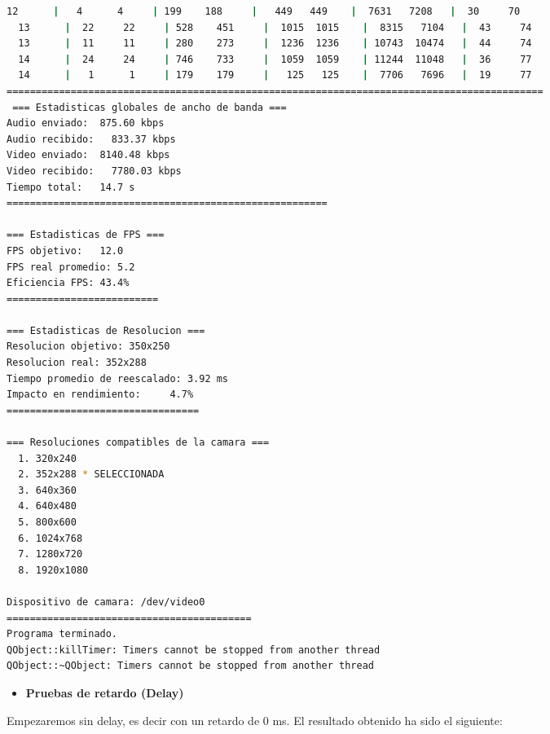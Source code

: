\begin{adjustbox}{max width=\textwidth}
\begin{lstlisting}[language=bash,basicstyle=\ttfamily\scriptsize]
  12      |   4      4     | 199    188     |   449   449    |  7631   7208   |  30     70
  13      |  22     22     | 528    451     |  1015  1015    |  8315   7104   |  43     74
  13      |  11     11     | 280    273     |  1236  1236    | 10743  10474   |  44     74
  14      |  24     24     | 746    733     |  1059  1059    | 11244  11048   |  36     77
  14      |   1      1     | 179    179     |   125   125    |  7706   7696   |  19     77
============================================================================================
 === Estadisticas globales de ancho de banda ===
Audio enviado:	875.60 kbps
Audio recibido:   833.37 kbps
Video enviado:	8140.48 kbps
Video recibido:   7780.03 kbps
Tiempo total: 	14.7 s
=======================================================

=== Estadisticas de FPS ===
FPS objetivo: 	12.0
FPS real promedio: 5.2
Eficiencia FPS:	43.4%
==========================

=== Estadisticas de Resolucion ===
Resolucion objetivo: 350x250
Resolucion real: 352x288
Tiempo promedio de reescalado: 3.92 ms
Impacto en rendimiento:    	4.7%
=================================

=== Resoluciones compatibles de la camara ===
  1. 320x240
  2. 352x288 * SELECCIONADA
  3. 640x360
  4. 640x480
  5. 800x600
  6. 1024x768
  7. 1280x720
  8. 1920x1080

Dispositivo de camara: /dev/video0
==========================================
Programa terminado.
QObject::killTimer: Timers cannot be stopped from another thread
QObject::~QObject: Timers cannot be stopped from another thread
\end{lstlisting}
\end{adjustbox}
\vspace{\baselineskip}

\newpage

\begin{itemize}
    \item \textbf{Pruebas de retardo (Delay)}
\end{itemize}

Empezaremos sin delay, es decir con un retardo de 0 ms. El resultado obtenido ha sido el siguiente:
\vspace{\baselineskip}

